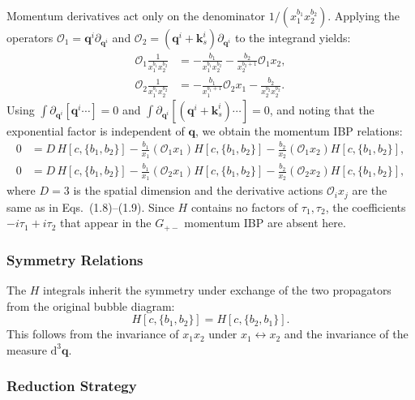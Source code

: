 \documentclass[a4paper,12pt]{article}
\def\di{{\mathrm{d}}}
\begin{document}
Momentum derivatives act only on the denominator $1/(x_1^{b_1}x_2^{b_2})$. Applying the operators $\mathcal{O}_1 = \bm q^i\partial_{\bm q^i}$ and $\mathcal{O}_2 = (\bm q^i+\bm k_s^i)\partial_{\bm q^i}$ to the integrand yields:
\begin{align}
	\mathcal{O}_1 \frac{1}{x_1^{b_1}x_2^{b_2}} & = -\frac{b_1}{x_1^{b_1}x_2^{b_2}} - \frac{b_2}{x_2^{b_2+1}} \mathcal{O}_1 x_2, \\
	\mathcal{O}_2 \frac{1}{x_1^{b_1}x_2^{b_2}} & = -\frac{b_1}{x_1^{b_1+1}} \mathcal{O}_2 x_1 - \frac{b_2}{x_2^{b_2}x_2^{b_2}}.
\end{align}
Using $\int \partial_{\bm q^i} [\bm q^i \cdots] = 0$ and $\int \partial_{\bm q^i} [(\bm q^i+\bm k_s^i) \cdots] = 0$, and noting that the exponential factor is independent of $\bm q$, we obtain the momentum IBP relations:
\begin{align}
	0 & = D\, H[c,\{b_1,b_2\}] - \frac{b_1}{x_1} (\mathcal{O}_1 x_1) H[c,\{b_1,b_2\}] - \frac{b_2}{x_2} (\mathcal{O}_1 x_2) H[c,\{b_1,b_2\}], \label{eq:HmomIBP1} \\
	0 & = D\, H[c,\{b_1,b_2\}] - \frac{b_1}{x_1} (\mathcal{O}_2 x_1) H[c,\{b_1,b_2\}] - \frac{b_2}{x_2} (\mathcal{O}_2 x_2) H[c,\{b_1,b_2\}], \label{eq:HmomIBP2}
\end{align}
where $D=3$ is the spatial dimension and the derivative actions $\mathcal{O}_i x_j$ are the same as in Eqs.~(1.8)--(1.9). Since $H$ contains no factors of $\tau_1,\tau_2$, the coefficients $-i\tau_1+i\tau_2$ that appear in the $G_{+-}$ momentum IBP are absent here.

\subsubsection{Symmetry Relations}

The $H$ integrals inherit the symmetry under exchange of the two propagators from the original bubble diagram:
\begin{equation}
	H[c,\{b_1,b_2\}] = H[c,\{b_2,b_1\}]. \label{eq:Hsym}
\end{equation}
This follows from the invariance of $x_1x_2$ under $x_1\leftrightarrow x_2$ and the invariance of the measure $\di^3\bm q$.

\subsubsection{Reduction Strategy}
\end{document}
